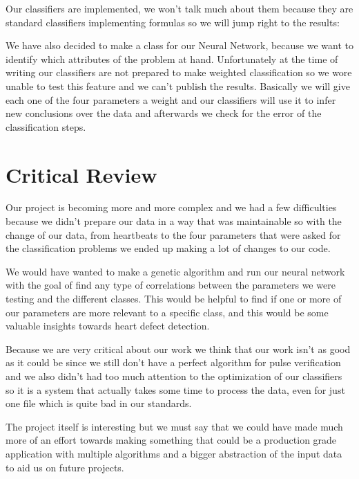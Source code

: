 \documentclass[conference]{IEEEtran}
\begin{document}
\begin{itemize}
\begin{itemize}
Our classifiers are implemented, we won't talk much about them because they are
standard classifiers implementing formulas so we will jump right to the results:

We have also decided to make a class for our Neural Network, because we want to
identify which attributes of the problem at hand. Unfortunately at the time of
writing our classifiers are not prepared to make weighted classification so we
wore unable to test this feature and we can't publish the results.
Basically we will give each one of the four parameters a weight and our
classifiers will use it to infer new conclusions over the data and afterwards
we check for the error of the classification steps.

\section{Critical Review}
Our project is becoming more and more complex and we had a few difficulties
because we didn't prepare our data in a way that was maintainable so with the
change of our data, from heartbeats to the four parameters that were asked for
the classification problems we ended up making a lot of changes to our code.

We would have wanted to make a genetic algorithm and run our neural network with
the goal of find any type of correlations between the parameters we were testing
and the different classes. This would be helpful to find if one or more of our
parameters are more relevant to a specific class, and this would be some
valuable insights towards heart defect detection.

Because we are very critical about our work we think that our work isn't as
good as it could be since we still don't have a perfect algorithm for pulse
verification and we also didn't had too much attention to the optimization of
our classifiers so it is a system that actually takes some time to process the
data, even for just one file which is quite bad in our standards.

The project itself is interesting but we must say that we could have made much
more of an effort towards making something that could be a production grade
application with multiple algorithms and a bigger abstraction of the input data
to aid us on future projects.


\end{itemize}
\end{itemize}
\end{document}
